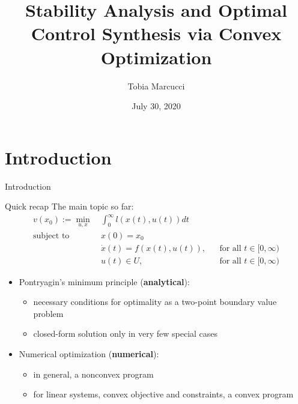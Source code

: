 \documentclass[aspectratio=169]{beamer}
\title[Stability and Control Synthesis via Convex Optimization]{Stability Analysis and Optimal Control Synthesis via Convex Optimization}
\author{Tobia Marcucci}
\institute{\textit{tobiam@mit.edu}}
\date{July 30, 2020}
\begin{document}
\begin{frame}
\titlepage
\end{frame}

\section{Introduction}
\begin{frame}
\huge
\centering
{\color{darkred} Introduction}
\end{frame}

\begin{frame}{Quick recap}
The main topic so far:
\begin{align*}
v(x_0) := \min_{u, x} \ &\int_0^\infty l(x(t), u(t)) dt \\
\text{subject to} \ & x(0) = x_0 \\
& \dot x(t) = f(x(t), u(t)), &&  \text{for all }t \in [0, \infty) \\
& u(t) \in U, &&  \text{for all }t \in [0, \infty)
\end{align*}
\begin{itemize}
\item
Pontryagin's minimum principle (\textbf{analytical}):
\begin{itemize}
\item
necessary conditions for optimality as a two-point boundary value problem
\item
closed-form solution only in very few special cases
\end{itemize}
\item
Numerical optimization (\textbf{numerical}):
\begin{itemize}
\item
in general, a nonconvex program
\item
for linear systems, convex objective and constraints, a convex program
\end{itemize}
\end{itemize}
\end{frame}
\end{document}
